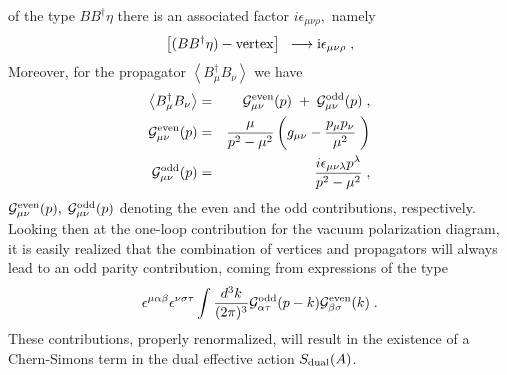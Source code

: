 \documentclass[a4paper,12pt]{article}
\begin{document}
  of the type $BB^{\dagger }\eta$ there is an associated factor $i\epsilon _{\mu \nu \rho},$ namely
\begin{equation}
\left[ (BB^{\dagger }\eta )-{\rm vertex}\right] {\rm {\ }\longrightarrow
i\epsilon _{\mu \nu \rho }\;,}  \label{vertex}
\end{equation}
Moreover, for the propagator $\left\langle B_\mu ^{\dagger }B_\nu \right\rangle $ we have
\begin{eqnarray}
\left\langle B_\mu ^{\dagger }B_\nu \right\rangle &=&\;{\cal G}_{\mu \nu }^{%
{\rm even}}(p)\;+\;{\cal G}_{\mu \nu }^{{\rm odd}}(p)\;,  \label{B-prop} \\
{\cal G}_{\mu \nu }^{{\rm even}}(p) &=&\frac \mu {p^2-\mu ^2}\left( g_{\mu
\nu }-\frac{p_\mu p_\nu }{\mu ^2}\;\right) \\
{\cal G}_{\mu \nu }^{{\rm odd}}(p) &=&\frac{i\epsilon _{\mu \nu \lambda
}p^\lambda }{p^2-\mu ^2}\;,
\end{eqnarray}
${\cal G}_{\mu \nu }^{{\rm even}}(p),\;{\cal G}_{\mu \nu }^{{\rm odd}}(p)$
denoting the even and the odd contributions, respectively. Looking
then at the one-loop contribution for the vacuum polarization diagram,
it is easily realized that the combination of vertices and propagators
will always lead to an odd parity contribution, coming from
expressions of the type
\begin{equation}
\epsilon ^{\mu \alpha \beta }\epsilon ^{\nu \sigma \tau }\int \frac{%
d^3k}{(2\pi )^3}{\cal G}_{\alpha \tau }^{{\rm odd}}(p-k){\cal G}_{\beta
\sigma }^{{\rm even}}(k)\;.  \label{pol}
\end{equation}
These contributions, properly renormalized, will result in the
existence of a Chern-Simons term in the dual effective action
$S_{{\rm dual}}(A)$.
\end{document}
